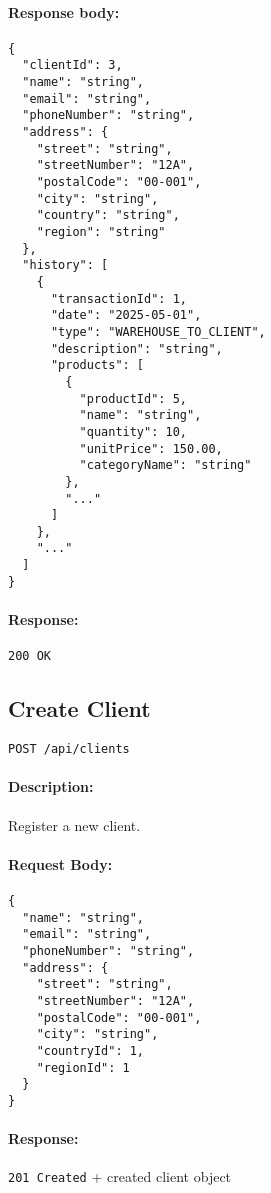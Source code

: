 \documentclass[a4paper,11pt]{article}
\begin{document}
\paragraph{Response body:}
\begin{verbatim}
{
  "clientId": 3,
  "name": "string",
  "email": "string",
  "phoneNumber": "string",
  "address": {
    "street": "string",
    "streetNumber": "12A",
    "postalCode": "00-001",
    "city": "string",
    "country": "string",
    "region": "string"
  },
  "history": [
    {
      "transactionId": 1,
      "date": "2025-05-01",
      "type": "WAREHOUSE_TO_CLIENT",
      "description": "string",
      "products": [
        {
          "productId": 5,
          "name": "string",
          "quantity": 10,
          "unitPrice": 150.00,
          "categoryName": "string"
        },
        "..."
      ]
    },
    "..."
  ]
}
\end{verbatim}
\paragraph{Response:} \texttt{200 OK}

\subsection{Create Client}
\label{sec:clients-create}
\begin{verbatim}
POST /api/clients
\end{verbatim}
\paragraph{Description:} Register a new client.
\paragraph{Request Body:}
\begin{verbatim}
{
  "name": "string",
  "email": "string",
  "phoneNumber": "string",
  "address": {
    "street": "string",
    "streetNumber": "12A",
    "postalCode": "00-001",
    "city": "string",
    "countryId": 1,
    "regionId": 1
  }
}
\end{verbatim}
\paragraph{Response:} \texttt{201 Created} + created client object
\end{document}
